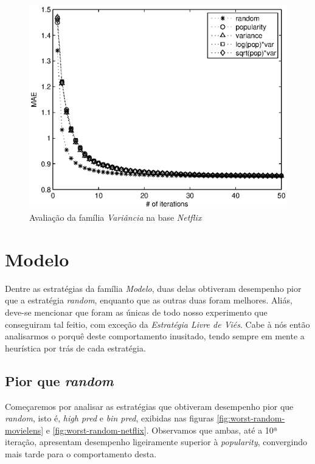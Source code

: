 \begin{figure}[ht]
\centering
\includegraphics{nf_variance_family.eps}
\caption{Avaliação da família \textit{Variância} na base \textit{Netflix}}
\label{fig:variance-netflix}
\end{figure}

\section{Modelo}

Dentre as estratégias da família \textit{Modelo}, duas delas obtiveram desempenho pior que a estratégia \textit{random}, enquanto que as outras duas foram melhores. Aliás, deve-se mencionar que foram as únicas de todo nosso experimento que conseguiram tal feitio, com exceção da \textit{Estratégia Livre de Viés}. Cabe à nós então analisarmos o porquê deste comportamento inusitado, tendo sempre em mente a heurística por trás de cada estratégia.

\subsection{Pior que \textit{random}}

Começaremos por analisar as estratégias que obtiveram desempenho pior que \textit{random}, isto é, \textit{high pred} e \textit{bin pred}, exibidas nas figuras \ref{fig:worst-random-movielens} e \ref{fig:worst-random-netflix}. Observamos que ambas, até a 10ª iteração, apresentam desempenho ligeiramente superior à \textit{popularity}, convergindo mais tarde para o comportamento desta.

